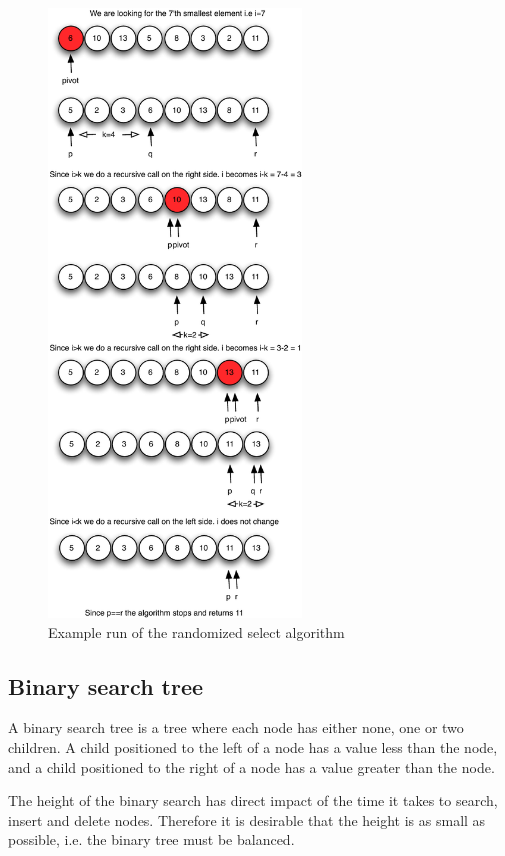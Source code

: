 \documentclass[10pt]{article}
\begin{document}
\begin{figure}[ht]
\centering
\includegraphics[width=0.6\textwidth]{figures/fig10.pdf}
\caption{Example run of the randomized select algorithm}
\label{fig10}
\end{figure}



\subsection{Binary search tree} %
\label{sub:binary_search_tree}
A binary search tree is a tree where each node has either none, one or two children. A child positioned to the left of a node has a value less than the node, and a child positioned to the right of a node has a value greater than the node.

The height of the binary search has direct impact of the time it takes to search, insert and delete nodes. Therefore it is desirable that the height is as small as possible, i.e. the binary tree must be balanced.
\end{document}
